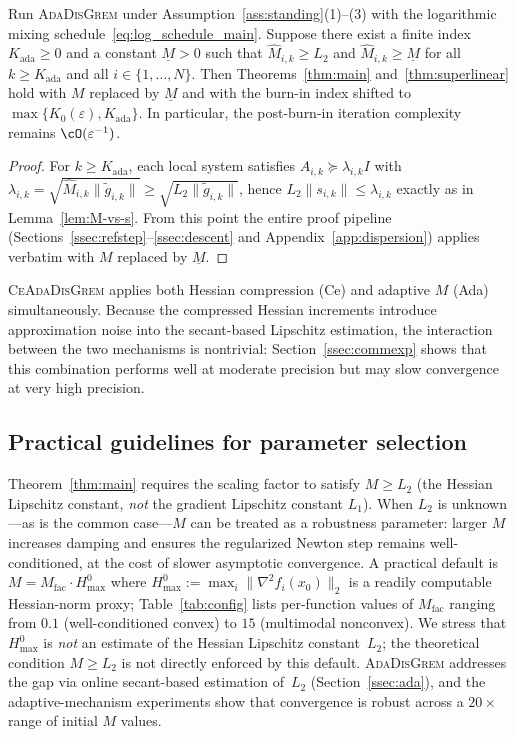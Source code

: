 \documentclass[review,onefignum,onetabnum]{siamart171218}
\begin{document}
	\begin{proposition}\label{prop:ada_cond}
	Run \textsc{AdaDisGrem} under Assumption~\ref{ass:standing}(1)--(3)
	with the logarithmic mixing schedule~\eqref{eq:log_schedule_main}.
	Suppose there exist a finite index $K_{\mathrm{ada}}\ge 0$ and a
	constant $\underline M>0$ such that
	$\hat M_{i,k}\ge L_2$ and $\hat M_{i,k}\ge \underline M$ for all
	$k\ge K_{\mathrm{ada}}$ and all $i\in\{1,\dots,N\}$.
	Then Theorems~\ref{thm:main} and~\ref{thm:superlinear} hold with
	$M$ replaced by $\underline M$ and with the burn-in index shifted
	to $\max\{K_0(\varepsilon),K_{\mathrm{ada}}\}$.
	In particular, the post-burn-in iteration complexity remains
	$\cO(\varepsilon^{-1})$.
	\end{proposition}
	\begin{proof}
	For $k\ge K_{\mathrm{ada}}$, each local system satisfies
	$A_{i,k}\succeq \lambda_{i,k}I$ with
	$\lambda_{i,k}=\sqrt{\hat M_{i,k}\|\tilde g_{i,k}\|}
	\ge \sqrt{L_2\|\tilde g_{i,k}\|}$,
	hence $L_2\|s_{i,k}\|\le \lambda_{i,k}$ exactly as in
	Lemma~\ref{lem:M-vs-s}.
	From this point the entire proof pipeline
	(Sections~\ref{ssec:refstep}--\ref{ssec:descent} and
	Appendix~\ref{app:dispersion}) applies verbatim with $M$
	replaced by $\underline M$.
	\end{proof}
	
	\textsc{CeAdaDisGrem} applies both Hessian compression (Ce) and
	adaptive $M$ (Ada) simultaneously.
	Because the compressed Hessian increments introduce approximation noise
	into the secant-based Lipschitz estimation, the interaction between
	the two mechanisms is nontrivial: Section~\ref{ssec:commexp} shows
	that this combination performs well at moderate precision but may slow
	convergence at very high precision.
	
	\subsection{Practical guidelines for parameter selection}\label{ssec:practical}
	
	Theorem~\ref{thm:main} requires the scaling factor to satisfy $M\ge L_2$
	(the Hessian Lipschitz constant, \emph{not} the gradient Lipschitz
	constant $L_1$).
	When $L_2$ is unknown---as is the common case---$M$ can be treated
	as a robustness parameter: larger $M$ increases damping and ensures the
	regularized Newton step remains well-conditioned, at the cost of
	slower asymptotic convergence.
	A practical default is $M = M_{\mathrm{fac}} \cdot H_{\max}^{0}$ where
	$H_{\max}^{0} := \max_i\|\nabla^2 f_i(x_0)\|_2$ is a readily
	computable Hessian-norm proxy;
	Table~\ref{tab:config} lists per-function values of $M_{\mathrm{fac}}$
	ranging from $0.1$ (well-conditioned convex) to $15$ (multimodal nonconvex).
	We stress that $H_{\max}^{0}$ is \emph{not} an estimate of the Hessian
	Lipschitz constant~$L_2$; the theoretical condition $M\ge L_2$
	is not directly enforced by this default.
	\textsc{AdaDisGrem} addresses the gap via online secant-based
	estimation of~$L_2$ (Section~\ref{ssec:ada}), and the
	adaptive-mechanism experiments show that convergence is robust
	across a $20\times$ range of initial $M$ values.
\end{document}
